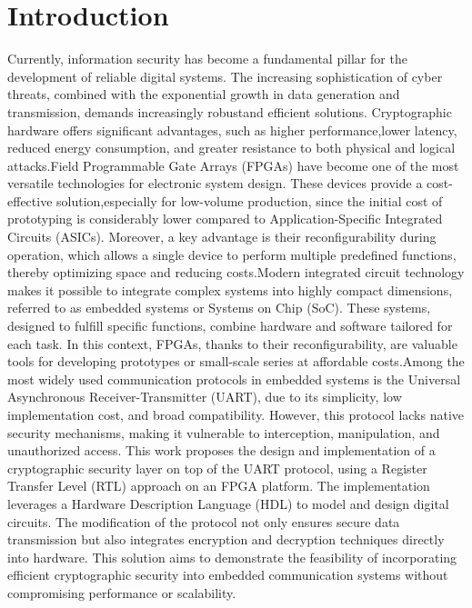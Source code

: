 \documentclass[journal,article,submit,pdftex,moreauthors]{Definitions/mdpi}
\begin{document}
\setcounter{section}{0} %



\section{Introduction}

Currently, information security has become a fundamental pillar for the development of reliable digital systems. The increasing sophistication of cyber threats, combined with the exponential growth in data generation and transmission, demands increasingly robustand efficient solutions. Cryptographic hardware offers significant advantages, such as higher performance,lower latency, reduced energy consumption, and greater resistance to both physical and logical attacks.Field Programmable Gate Arrays (FPGAs) have become one of the most versatile technologies for electronic system design. These devices provide a cost-effective solution,especially for low-volume production, since the initial cost of prototyping is considerably lower compared to Application-Specific Integrated Circuits (ASICs). Moreover, a key advantage is their reconfigurability during operation, which allows a single device to perform multiple predefined functions, thereby optimizing space and reducing costs.Modern integrated circuit technology makes it possible to integrate complex systems into highly compact dimensions, referred to as embedded systems or Systems on Chip (SoC). These systems, designed to fulfill specific functions, combine hardware and software tailored for each task. In this context, FPGAs, thanks to their reconfigurability, are valuable tools for developing prototypes or small-scale series at affordable costs.Among the most widely used communication protocols in embedded systems is the Universal Asynchronous Receiver-Transmitter (UART), due to its simplicity, low implementation cost, and broad compatibility. However, this protocol lacks native security mechanisms, making it vulnerable to interception, manipulation, and unauthorized access. This work proposes the design and implementation of a cryptographic security layer on top of the UART protocol, using a Register Transfer Level (RTL) approach on an FPGA platform. The implementation leverages a Hardware Description Language (HDL) to model and design digital circuits. The modification of the protocol not only ensures secure data transmission but also integrates encryption and decryption techniques directly into hardware. This solution aims to demonstrate the feasibility of incorporating efficient cryptographic security into embedded communication systems without compromising performance or scalability.
\end{document}
